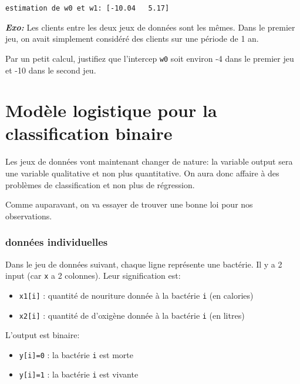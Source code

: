 \documentclass[11pt]{article}
\providecommand{\tightlist}{%
      \setlength{\itemsep}{0pt}\setlength{\parskip}{0pt}}
\begin{document}
    \begin{Verbatim}[commandchars=\\\{\}]
estimation de w0 et w1: [-10.04   5.17]

    \end{Verbatim}

    \textbf{\emph{Exo:}} Les clients entre les deux jeux de données sont les
mêmes. Dans le premier jeu, on avait simplement considéré des clients
sur une période de 1 an.

Par un petit calcul, justifiez que l'intercep \texttt{w0} soit environ
-4 dans le premier jeu et -10 dans le second jeu.

    \hypertarget{moduxe8le-logistique-pour-la-classification-binaire}{%
\section{Modèle logistique pour la classification
binaire}\label{moduxe8le-logistique-pour-la-classification-binaire}}

Les jeux de données vont maintenant changer de nature: la variable
output sera une variable qualitative et non plus quantitative. On aura
donc affaire à des problèmes de classification et non plus de
régression.

Comme auparavant, on va essayer de trouver une bonne loi pour nos
observations.

    \hypertarget{donnuxe9es-individuelles}{%
\subsubsection{données individuelles}\label{donnuxe9es-individuelles}}

    Dans le jeu de données suivant, chaque ligne représente une bactérie. Il
y a 2 input (car \texttt{x} a 2 colonnes). Leur signification est:

\begin{itemize}
\tightlist
\item
  \texttt{x1{[}i{]}} : quantité de nouriture donnée à la bactérie
  \texttt{i} (en calories)
\item
  \texttt{x2{[}i{]}} : quantité de d'oxigène donnée à la bactérie
  \texttt{i} (en litres)
\end{itemize}

L'output est binaire:

\begin{itemize}
\tightlist
\item
  \texttt{y{[}i{]}=0} : la bactérie \texttt{i} est morte
\item
  \texttt{y{[}i{]}=1} : la bactérie \texttt{i} est vivante
\end{itemize}
\end{document}
